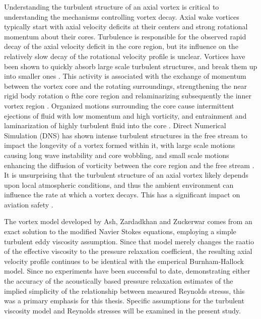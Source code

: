 Understanding the turbulent structure of an axial vortex is critical to 
understanding the mechanisms controlling vortex decay. Axial wake vortices 
typically 
start with axial velocity deficits at their centers and strong rotational 
momentum about their cores. Turbulence is responsible for the observed rapid 
decay of the axial velocity deficit in the core region, but its influence on 
the relatively slow decay of the rotational velocity profile is  unclear. 
Vortices have been shown to quickly absorb large 
scale turbulent structures, and break them up into smaller ones 
\cite{ragab1994,beninati2005}. This activity 
is associated with the exchange of momentum between the vortex core and the 
rotating surroundings, strengthening the near rigid body rotation o fthe core 
region and relaminarizing subsequently the inner vortex region 
\cite{bandyopadhyay1991}. Organized motions surrounding the core 
cause intermittent ejections of fluid with low momentum and high vorticity, and 
entrainment and laminarization of highly turbulent fluid into the core 
\cite{bandyopadhyay1991}. Direct Numerical Simulation (DNS) has shown 
intense turbulent structures in the free stream to impact the longevity of a 
vortex formed within it, with large scale motions causing long wave instability 
and core wobbling, and small scale motions enhancing the diffusion of vorticity 
between the core region and the free stream \cite{risso1997}. It is 
unsurprising that the turbulent structure of an axial vortex likely depends
upon local atmospheric conditions, and thus the ambient environment can 
influence the rate at which a vortex decays. This has a significant impact on 
aviation safety \cite{ash1998}.

The vortex model developed by Ash, Zardadkhan and Zuckerwar \cite{ash2011} 
comes from an exact solution to the modified
Navier Stokes equations, employing a simple turbulent eddy viscosity 
assumption. Since that model merely changes the raatio of the effective 
viscosity to the pressure relaxation coefficient, the resulting axial velocity 
profile continues to be identical with the emperical Burnham-Hallock model. 
Since no experiments have been successful to date, demonstrating either the 
accuracy of the acoustically based pressure relaxation estimates of the implied 
simplicity of the relationship between measured Reynolds stresss, this was a 
primary emphasis for this thesis. Specific 
assumptions for the turbulent viscosity model and Reynolds stresses will be 
examined in the present study.
